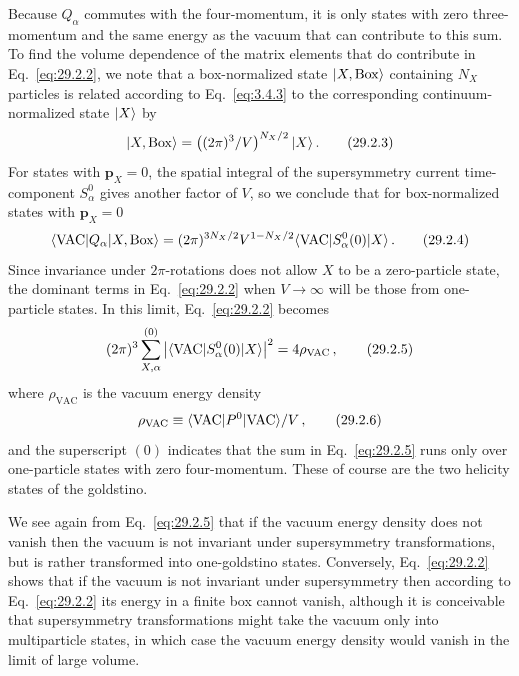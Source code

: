 Because \(Q_\alpha\) commutes with the four-momentum, it is only states
with zero three-momentum and the same energy as the vacuum that can
contribute to this sum. To find the volume dependence of the matrix
elements that do contribute in Eq.~\eqref{eq:29.2.2}, we note that a
box-normalized state \(\lvert X,\mathrm{Box}\rangle\) containing \(N_X\)
particles is related according to Eq.~\eqref{eq:3.4.3} to the
corresponding continuum-normalized state \(\lvert X\rangle\) by
\begin{equation}
  \lvert X,\mathrm{Box}\rangle
  =\left((2\pi)^3/V\right)^{N_X/2}\lvert X\rangle\,.
  \tag{29.2.3}\label{eq:29.2.3}
\end{equation}
For states with \(\mathbf p_X=0\), the spatial integral of the
supersymmetry current time-component \(S_\alpha^0\) gives another factor
of \(V\), so we conclude that for box-normalized states with
\(\mathbf p_X=0\)
\begin{equation}
  \langle \mathrm{VAC}\rvert Q_\alpha\lvert X,\mathrm{Box}\rangle
  =(2\pi)^{3N_X/2}V^{1-N_X/2}
  \langle \mathrm{VAC}\rvert S_\alpha^0(0)\lvert X\rangle\,.
  \tag{29.2.4}\label{eq:29.2.4}
\end{equation}
Since invariance under \(2\pi\)-rotations does not allow \(X\) to be a
zero-particle state, the dominant terms in Eq.~\eqref{eq:29.2.2} when
\(V\to\infty\) will be those from one-particle states. In this limit,
Eq.~\eqref{eq:29.2.2} becomes
\begin{equation}
  (2\pi)^3\sum_{X,\alpha}^{(0)}
  \left\lvert
    \langle \mathrm{VAC}\rvert S_\alpha^0(0)\lvert X\rangle
  \right\rvert^2
  =4\rho_{\mathrm{VAC}}\,,
  \tag{29.2.5}\label{eq:29.2.5}
\end{equation}
where \(\rho_{\mathrm{VAC}}\) is the vacuum energy density
\begin{equation}
  \rho_{\mathrm{VAC}}
  \equiv
  \langle \mathrm{VAC}\rvert P^0\lvert \mathrm{VAC}\rangle/V\,,
  \tag{29.2.6}\label{eq:29.2.6}
\end{equation}
and the superscript \((0)\) indicates that the sum in
Eq.~\eqref{eq:29.2.5} runs only over one-particle states with zero
four-momentum. These of course are the two helicity states of the
goldstino.

We see again from Eq.~\eqref{eq:29.2.5} that if the vacuum energy density
does not vanish then the vacuum is not invariant under supersymmetry
transformations, but is rather transformed into one-goldstino states.
Conversely, Eq.~\eqref{eq:29.2.2} shows that if the vacuum is not invariant
under supersymmetry then according to Eq.~\eqref{eq:29.2.2} its energy in
a finite box cannot vanish, although it is conceivable that supersymmetry
transformations might take the vacuum only into multiparticle states, in
which case the vacuum energy density would vanish in the limit of large
volume.

